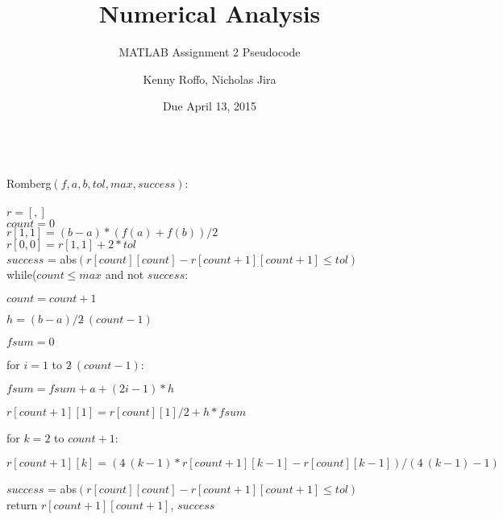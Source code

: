 \documentclass{scrartcl}
\title{Numerical Analysis}
\subtitle{MATLAB Assignment 2 Pseudocode}
\author{Kenny Roffo, Nicholas Jira}
\date{Due April 13, 2015}
\begin{document}
\maketitle
\ \\
Romberg$(f,a,b,tol,max,success)$:\\\\
$r=[,]$\\
$count=0$\\
$r[1,1]=(b-a)*(f(a)+f(b))/2$\\
$r[0,0]=r[1,1]+2*tol$\\
$success$ = abs$(r[count][count] - r[count+1][count+1] \le tol)$\\
while($count \le max$ and not $success$:

$count=count+1$

$h=(b-a)/2\hat \ (count-1)$

$fsum=0$

for $i=1$ to $2\hat \ (count-1)$:

\hspace{0.25 in}$fsum=fsum+a+(2i-1)*h$

$r[count+1][1]=r[count][1]/2+h*fsum$

for $k=2$ to $count+1$:

\hspace{0.25 in}$r[count+1][k]=(4\hat \ (k-1)*r[count+1][k-1]-r[count][k-1])/(4\hat \ (k-1)-1)$

$success$ = abs$(r[count][count] - r[count+1][count+1] \le tol)$\\
return $r[count+1][count+1]$, $success$
\end{document}
